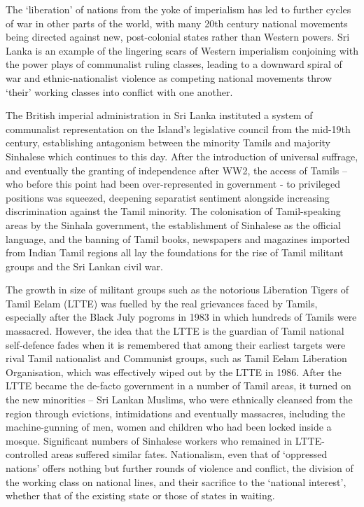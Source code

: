 The ‘liberation’ of nations from the yoke of imperialism has led to further cycles of war in other parts of the world, with many 20th century national movements being directed against new, post-colonial states rather than Western powers.
Sri Lanka is an example of the lingering scars of Western imperialism conjoining with the power plays of communalist ruling classes, leading to a downward spiral of war and ethnic-nationalist violence as competing national movements throw ‘their’ working classes into conflict with one another.

The British imperial administration in Sri Lanka instituted a system of communalist representation on the Island’s legislative council from the mid-19th century, establishing antagonism between the minority Tamils and majority Sinhalese which continues to this day.
After the introduction of universal suffrage, and eventually the granting of independence after WW2, the access of Tamils – who before this point had been over-represented in government - to privileged positions was squeezed, deepening separatist sentiment alongside increasing discrimination against the Tamil minority.
The colonisation of Tamil-speaking areas by the Sinhala government, the establishment of Sinhalese as the official language, and the banning of Tamil books, newspapers and magazines imported from Indian Tamil regions all lay the foundations for the rise of Tamil militant groups and the Sri Lankan civil war.

The growth in size of militant groups such as the notorious Liberation Tigers of Tamil Eelam (LTTE) was fuelled by the real grievances faced by Tamils, especially after the Black July pogroms in 1983 in which hundreds of Tamils were massacred.
However, the idea that the LTTE is the guardian of Tamil national self-defence fades when it is remembered that among their earliest targets were rival Tamil nationalist and Communist groups, such as Tamil Eelam Liberation Organisation, which was effectively wiped out by the LTTE in 1986.
After the LTTE became the de-facto government in a number of Tamil areas, it turned on the new minorities – Sri Lankan Muslims, who were ethnically cleansed from the region through evictions, intimidations and eventually massacres, including the machine-gunning of men, women and children who had been locked inside a mosque.
Significant numbers of Sinhalese workers who remained in LTTE-controlled areas suffered similar fates.
Nationalism, even that of ‘oppressed nations’ offers nothing but further rounds of violence and conflict, the division of the working class on national lines, and their sacrifice to the ‘national interest’, whether that of the existing state or those of states in waiting.

